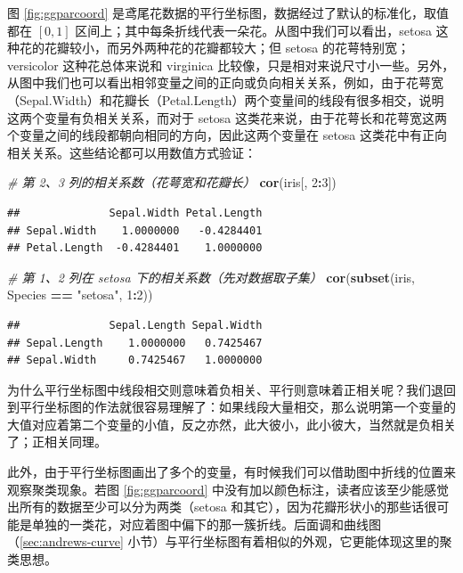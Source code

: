 \documentclass[
  b5paper,
  UTF8,twoside]{book}
\newenvironment{Shaded}{\begin{snugshade}}{\end{snugshade}}
\newcommand{\CommentTok}[1]{\textcolor[rgb]{0.56,0.35,0.01}{\textit{#1}}}
\newcommand{\DecValTok}[1]{\textcolor[rgb]{0.00,0.00,0.81}{#1}}
\newcommand{\FunctionTok}[1]{\textcolor[rgb]{0.13,0.29,0.53}{\textbf{#1}}}
\newcommand{\NormalTok}[1]{#1}
\newcommand{\SpecialCharTok}[1]{\textcolor[rgb]{0.81,0.36,0.00}{\textbf{#1}}}
\newcommand{\StringTok}[1]{\textcolor[rgb]{0.31,0.60,0.02}{#1}}
\begin{document}
图 \ref{fig:ggparcoord} 是鸢尾花数据的平行坐标图，数据经过了默认的标准化，取值都在 \([0,1]\) 区间上；其中每条折线代表一朵花。从图中我们可以看出，setosa 这种花的花瓣较小，而另外两种花的花瓣都较大；但 setosa 的花萼特别宽；versicolor 这种花总体来说和 virginica 比较像，只是相对来说尺寸小一些。另外，从图中我们也可以看出相邻变量之间的正向或负向相关关系，例如，由于花萼宽（Sepal.Width）和花瓣长（Petal.Length）两个变量间的线段有很多相交，说明这两个变量有负相关关系，而对于 setosa 这类花来说，由于花萼长和花萼宽这两个变量之间的线段都朝向相同的方向，因此这两个变量在 setosa 这类花中有正向相关关系。这些结论都可以用数值方式验证：

\begin{Shaded}
\begin{Highlighting}[]
\CommentTok{\# 第 2、3 列的相关系数（花萼宽和花瓣长）}
\FunctionTok{cor}\NormalTok{(iris[, }\DecValTok{2}\SpecialCharTok{:}\DecValTok{3}\NormalTok{])}
\end{Highlighting}
\end{Shaded}

\begin{verbatim}
##              Sepal.Width Petal.Length
## Sepal.Width    1.0000000   -0.4284401
## Petal.Length  -0.4284401    1.0000000
\end{verbatim}

\begin{Shaded}
\begin{Highlighting}[]
\CommentTok{\# 第 1、2 列在 setosa 下的相关系数（先对数据取子集）}
\FunctionTok{cor}\NormalTok{(}\FunctionTok{subset}\NormalTok{(iris, Species }\SpecialCharTok{==} \StringTok{"setosa"}\NormalTok{, }\DecValTok{1}\SpecialCharTok{:}\DecValTok{2}\NormalTok{))}
\end{Highlighting}
\end{Shaded}

\begin{verbatim}
##              Sepal.Length Sepal.Width
## Sepal.Length    1.0000000   0.7425467
## Sepal.Width     0.7425467   1.0000000
\end{verbatim}

为什么平行坐标图中线段相交则意味着负相关、平行则意味着正相关呢？我们退回到平行坐标图的作法就很容易理解了：如果线段大量相交，那么说明第一个变量的大值对应着第二个变量的小值，反之亦然，此大彼小，此小彼大，当然就是负相关了；正相关同理。

此外，由于平行坐标图画出了多个的变量，有时候我们可以借助图中折线的位置来观察聚类现象。若图 \ref{fig:ggparcoord}
中没有加以颜色标注，读者应该至少能感觉出所有的数据至少可以分为两类（setosa 和其它），因为花瓣形状小的那些话很可能是单独的一类花，对应着图中偏下的那一簇折线。后面调和曲线图（\ref{sec:andrews-curve} 小节）与平行坐标图有着相似的外观，它更能体现这里的聚类思想。
\end{document}
